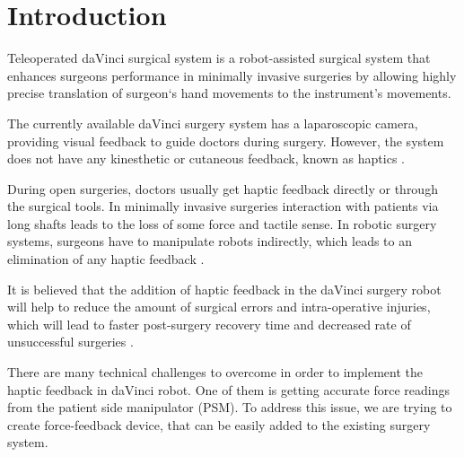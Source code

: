 \chapter{Introduction}
\label{intro} %


Teleoperated daVinci surgical system is a robot-assisted surgical 
system that enhances surgeons performance in minimally invasive surgeries by 
allowing highly precise translation of surgeon`s hand movements to the instrument's movements. 

The currently available daVinci surgery system 
has a laparoscopic camera, providing visual feedback to guide doctors during 
surgery. However, the system does not have any kinesthetic or cutaneous feedback, 
known as haptics \cite{_intuitive_2018}.


During open surgeries, doctors usually get haptic feedback directly or through 
the surgical tools. In minimally invasive surgeries interaction with patients 
via long shafts leads to the loss of some force and tactile sense. In robotic 
surgery systems, surgeons have to manipulate robots indirectly, which leads to 
an elimination of any haptic feedback \cite{okamura_haptic_2009}.

It is believed that the addition of haptic feedback in the daVinci surgery 
robot will help to reduce the amount of surgical errors and intra-operative 
injuries, which will lead to faster post-surgery recovery time and decreased 
rate of unsuccessful surgeries \cite{reiley_effects_2008, van_der_meijden_value_2009, okamura_haptic_2009}.

There are many technical challenges to overcome in 
order to implement the haptic feedback in daVinci robot. One of them is 
getting accurate force readings from the patient side manipulator (PSM). 
To address this issue, we are trying to create force-feedback device, that can 
be easily added to the existing surgery system.